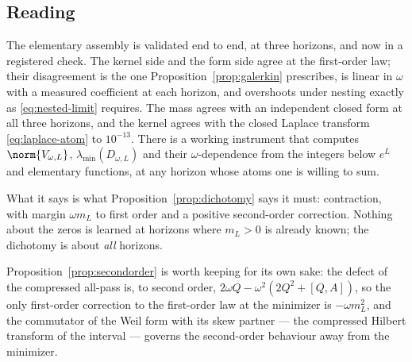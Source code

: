 \subsection{Reading}

The elementary assembly is validated end to end, at three horizons, and now in
a registered check. The kernel side and the form side agree at the first-order
law; their disagreement is the one Proposition~\ref{prop:galerkin} prescribes,
is linear in $\omega$ with a measured coefficient at each horizon, and
overshoots under nesting exactly as \eqref{eq:nested-limit} requires. The mass
agrees with an independent closed form at all three horizons, and the kernel
agrees with the closed Laplace transform \eqref{eq:laplace-atom} to
$10^{-13}$. There is a working instrument that computes $\norm{V_{\omega,L}}$,
$\lambda_{\min}(D_{\omega,L})$ and their $\omega$-dependence from the integers
below $e^L$ and elementary functions, at any horizon whose atoms one is willing
to sum.

What it says is what Proposition~\ref{prop:dichotomy} says it must:
contraction, with margin $\omega m_L$ to first order and a positive
second-order correction. Nothing about the zeros is learned at horizons where
$m_L>0$ is already known; the dichotomy is about \emph{all} horizons.

Proposition~\ref{prop:secondorder} is worth keeping for its own sake: the
defect of the compressed all-pass is, to second order, $2\omega Q-\omega^2(2Q^2+[Q,A])$,
so the only first-order correction to the first-order law at the minimizer is
$-\omega m_L^2$, and the commutator of the Weil form with its skew partner ---
the compressed Hilbert transform of the interval --- governs the second-order
behaviour away from the minimizer.

